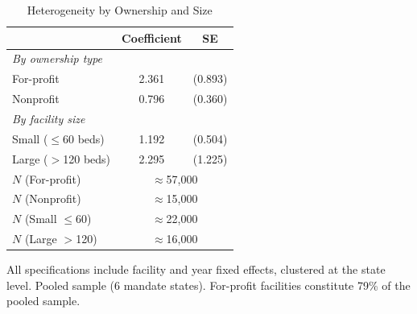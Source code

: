 \begin{table}[htbp]
\centering
\caption{Heterogeneity by Ownership and Size}
\label{tab:heterogeneity}
\begin{tabular}{lcc}
\toprule
 & Coefficient & SE \\
\midrule
\multicolumn{3}{l}{\textit{By ownership type}} \\[0.3em]
For-profit & 2.361 & (0.893) \\
Nonprofit & 0.796 & (0.360) \\[0.3em]
\multicolumn{3}{l}{\textit{By facility size}} \\[0.3em]
Small ($\leq$60 beds) & 1.192 & (0.504) \\
Large ($>$120 beds) & 2.295 & (1.225) \\
\midrule
$N$ (For-profit) & \multicolumn{2}{c}{$\approx$57,000} \\
$N$ (Nonprofit) & \multicolumn{2}{c}{$\approx$15,000} \\
$N$ (Small $\leq$60) & \multicolumn{2}{c}{$\approx$22,000} \\
$N$ (Large $>$120) & \multicolumn{2}{c}{$\approx$16,000} \\
\bottomrule
\end{tabular}
\begin{flushleft}\small
All specifications include facility and year fixed effects, clustered at the state level. Pooled sample (6 mandate states). For-profit facilities constitute 79\% of the pooled sample.
\end{flushleft}
\end{table}
